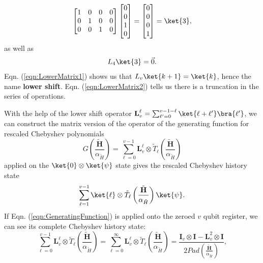 \begin{example}
\begin{equation}
\begin{bmatrix}
            1&0&0&0\\
            0&1&0&0\\
            0&0&1&0
        \end{bmatrix}
        \begin{bmatrix}
            0\\0\\1\\0
        \end{bmatrix}
        =\begin{bmatrix}
            0\\0\\0\\1
        \end{bmatrix}=\ket{3},
        \label{eqn:LowerMatrix1}
    \end{equation}
    as well as \begin{equation}
        L_4\ket{3}=\vec{0}.
        \label{eqn:LowerMatrix2}
    \end{equation}
    Eqn. (\ref{eqn:LowerMatrix1}) shows us that $L_v\ket{k+1}=\ket{k}$, hence the name \textbf{lower shift}. Eqn. (\ref{eqn:LowerMatrix2}) tells us there is a truncation in the series of operations.
\end{example}
With the help of the lower shift operator $\textbf{L}_v^{\ell}=\sum_{\ell^{\prime}=0}^{v-1-\ell}\ket{\ell+\ell^{\prime}}\bra{\ell^{\prime}}$, we can construct the matrix version of the operator of the generating function for rescaled Chebyshev polynomials 
\begin{equation}
    G\left(\frac{\tilde{\textbf{H}}}{\alpha_{\tilde{H}}}\right)=\sum_{\ell=0}^{v-1}\textbf{L}_v^{\ell}\otimes\tilde{T}_{\ell}\left(\frac{\tilde{\textbf{H}}}{\alpha_{\tilde{H}}}\right)
    \label{eqn:GeneratingFunction}
\end{equation}
applied on the $\ket{0}\otimes\ket{\psi}$ state gives the rescaled Chebyshev history state
\begin{equation}
    \sum_{\ell=1}^{v-1}\ket{\ell}\otimes\tilde{T}_{\ell}\left(\frac{\tilde{\textbf{H}}}{\alpha_{\tilde{H}}}\right)\ket{\psi}.
\end{equation}
If Eqn. (\ref{eqn:GeneratingFunction}) is applied onto the zeroed $v$ qubit register, we can see its complete Chebyshev history state:
\begin{equation}
    \sum_{\ell=0}^{v-1}\textbf{L}_v^{\ell}\otimes\tilde{T}_{\ell}\left(\frac{\tilde{\textbf{H}}}{\alpha_{\tilde{H}}}\right) =\sum_{\ell=0}^{\infty}\textbf{L}_v^{\ell}\otimes\tilde{T}_{\ell}\left(\frac{\tilde{\textbf{H}}}{\alpha_{\tilde{H}}}\right) 
    =\frac{\textbf{I}_v\otimes\textbf{I}-\textbf{L}_v^{2}\otimes\textbf{I}}{2Pad\left(\frac{\tilde{\textbf{H}}}{\alpha_{\tilde{H}}}\right)},
\end{equation}
